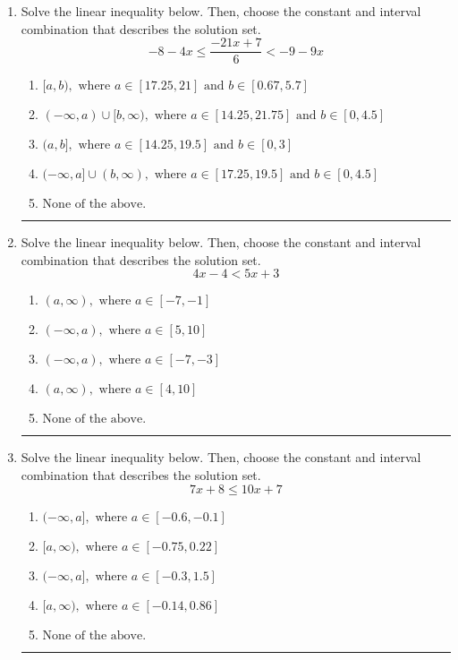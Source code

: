 \documentclass[14pt]{extbook}
\newcommand{\litem}[1]{\item#1\hspace*{-1cm}\rule{\textwidth}{0.4pt}}
\begin{document}
\begin{enumerate}
{\begin{enumerate}[label=\Alph*.]
\end{enumerate} }
\litem{
Solve the linear inequality below. Then, choose the constant and interval combination that describes the solution set.\[ -8 - 4 x \leq \frac{-21 x + 7}{6} < -9 - 9 x \]\begin{enumerate}[label=\Alph*.]
\item \( [a, b), \text{ where } a \in [17.25, 21] \text{ and } b \in [0.67, 5.7] \)
\item \( (-\infty, a) \cup [b, \infty), \text{ where } a \in [14.25, 21.75] \text{ and } b \in [0, 4.5] \)
\item \( (a, b], \text{ where } a \in [14.25, 19.5] \text{ and } b \in [0, 3] \)
\item \( (-\infty, a] \cup (b, \infty), \text{ where } a \in [17.25, 19.5] \text{ and } b \in [0, 4.5] \)
\item \( \text{None of the above.} \)

\end{enumerate} }
\litem{
Solve the linear inequality below. Then, choose the constant and interval combination that describes the solution set.\[ 4x -4 < 5x + 3 \]\begin{enumerate}[label=\Alph*.]
\item \( (a, \infty), \text{ where } a \in [-7, -1] \)
\item \( (-\infty, a), \text{ where } a \in [5, 10] \)
\item \( (-\infty, a), \text{ where } a \in [-7, -3] \)
\item \( (a, \infty), \text{ where } a \in [4, 10] \)
\item \( \text{None of the above}. \)

\end{enumerate} }
\litem{
Solve the linear inequality below. Then, choose the constant and interval combination that describes the solution set.\[ 7x + 8 \leq 10x + 7 \]\begin{enumerate}[label=\Alph*.]
\item \( (-\infty, a], \text{ where } a \in [-0.6, -0.1] \)
\item \( [a, \infty), \text{ where } a \in [-0.75, 0.22] \)
\item \( (-\infty, a], \text{ where } a \in [-0.3, 1.5] \)
\item \( [a, \infty), \text{ where } a \in [-0.14, 0.86] \)
\item \( \text{None of the above}. \)


\end{enumerate}}
\end{enumerate}
\end{document}
